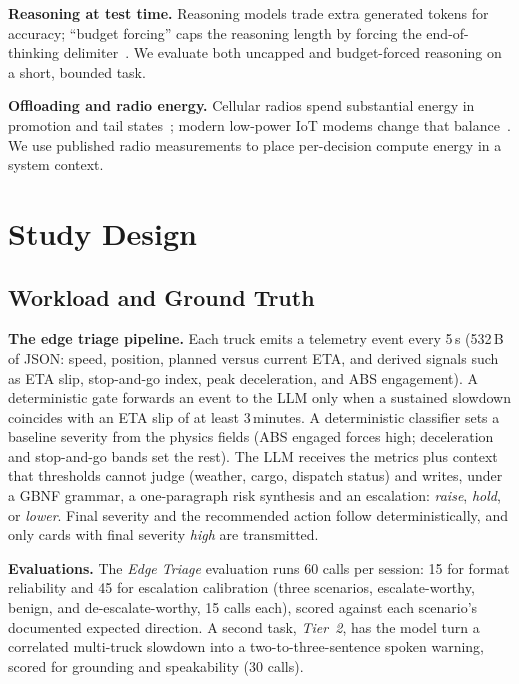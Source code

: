\documentclass[conference]{IEEEtran}
\begin{document}
\textbf{Reasoning at test time.} Reasoning models trade extra generated tokens for accuracy; ``budget forcing'' caps the reasoning length by forcing the end-of-thinking delimiter~\cite{muennighoff2025s1}. We evaluate both uncapped and budget-forced reasoning on a short, bounded task.

\textbf{Offloading and radio energy.} Cellular radios spend substantial energy in promotion and tail states~\cite{huang2012lte}; modern low-power IoT modems change that balance~\cite{nepal2026ltem}. We use published radio measurements to place per-decision compute energy in a system context.

\section{Study Design}

\subsection{Workload and Ground Truth}

\textbf{The edge triage pipeline.} Each truck emits a telemetry event every 5\,s (532\,B of JSON: speed, position, planned versus current ETA, and derived signals such as ETA slip, stop-and-go index, peak deceleration, and ABS engagement). A deterministic gate forwards an event to the LLM only when a sustained slowdown coincides with an ETA slip of at least 3\,minutes. A deterministic classifier sets a baseline severity from the physics fields (ABS engaged forces high; deceleration and stop-and-go bands set the rest). The LLM receives the metrics plus context that thresholds cannot judge (weather, cargo, dispatch status) and writes, under a GBNF grammar, a one-paragraph risk synthesis and an escalation: \emph{raise}, \emph{hold}, or \emph{lower}. Final severity and the recommended action follow deterministically, and only cards with final severity \emph{high} are transmitted.

\textbf{Evaluations.} The \emph{Edge Triage} evaluation runs 60 calls per session: 15 for format reliability and 45 for escalation calibration (three scenarios, escalate-worthy, benign, and de-escalate-worthy, 15 calls each), scored against each scenario's documented expected direction. A second task, \emph{Tier~2}, has the model turn a correlated multi-truck slowdown into a two-to-three-sentence spoken warning, scored for grounding and speakability (30 calls).
\end{document}
